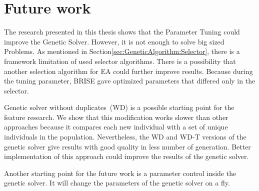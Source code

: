 \chapter{Future work}
\label{chapter:futureWork}

The research presented in this thesis shows that the Parameter Tuning could improve the Genetic Solver. However, it is not enough to solve big sized Problems. As mentioned in Section\ref{sec:GeneticAlgorithm:Selector}, there is a framework limitation of used selector algorithms. There is a possibility that another selection algorithm for EA could further improve results. Because during the tuning parameter, BRISE gave optimized parameters that differed only in the selector.

Genetic solver without duplicates~(WD) is a possible starting point for the feature research. We show that this modification works slower than other approaches because it compares each new individual with a set of unique individuals in the population. Nevertheless, the WD and WD-T versions of the genetic solver give results with good quality in less number of generation. Better implementation of this approach could improve the results of the genetic solver.

Another starting point for the future work is a parameter control inside the genetic solver. It will change the parameters of the genetic solver on a fly. 